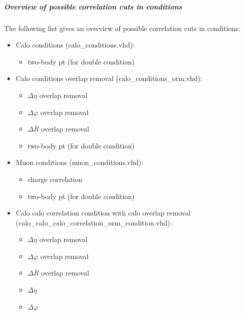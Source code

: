 \subparagraph{Overview of possible correlation cuts in conditions}
\label{sec:gtl:overview_correlation_cuts}

The following list gives an overview of possible correlation cuts in conditions:

\begin{itemize}
\item Calo conditions (calo\_conditions.vhd):
\begin{itemize}
\item two-body pt (for double condition)
\end{itemize}
\item Calo conditions overlap removal (calo\_conditions\_orm.vhd):
\begin{itemize}
\item $\Delta\eta$ overlap removal
\item $\Delta\varphi$ overlap removal
\item $\Delta$$R$ overlap removal
\item two-body pt (for double condition)
\end{itemize}
\item Muon conditions (muon\_conditions.vhd):
\begin{itemize}
\item charge correlation
\item two-body pt (for double condition)
\end{itemize}
\item Calo calo correlation condition with calo overlap removal (calo\_calo\_calo\_correlation\_orm\_condition.vhd):
\begin{itemize}
\item $\Delta\eta$ overlap removal
\item $\Delta\varphi$ overlap removal
\item $\Delta$$R$ overlap removal
\item $\Delta\eta$
\item $\Delta\varphi$
$$
\end{itemize}
\end{itemize}
